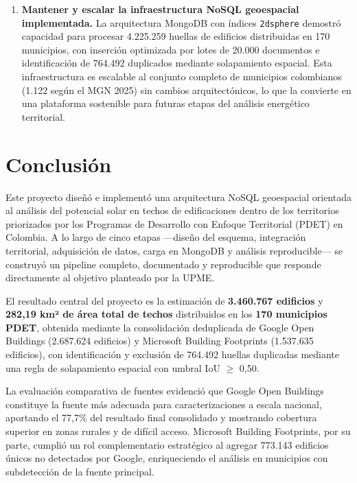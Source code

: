 \documentclass{article}
\begin{document}
\begin{enumerate}
    \item \textbf{Mantener y escalar la infraestructura NoSQL geoespacial 
    implementada.} La arquitectura MongoDB con índices \texttt{2dsphere} 
    demostró capacidad para procesar 4.225.259 huellas de edificios 
    distribuidas en 170 municipios, con inserción optimizada por lotes de 
    20.000 documentos e identificación de 764.492 duplicados mediante 
    solapamiento espacial. Esta infraestructura es escalable al conjunto 
    completo de municipios colombianos (1.122 según el MGN 2025) sin 
    cambios arquitectónicos, lo que la convierte en una plataforma 
    sostenible para futuras etapas del análisis energético territorial.

\end{enumerate}


\section{Conclusión}

Este proyecto diseñó e implementó una arquitectura NoSQL geoespacial 
orientada al análisis del potencial solar en techos de edificaciones 
dentro de los territorios priorizados por los Programas de Desarrollo 
con Enfoque Territorial (PDET) en Colombia. A lo largo de cinco etapas 
—diseño del esquema, integración territorial, adquisición de datos, 
carga en MongoDB y análisis reproducible— se construyó un pipeline 
completo, documentado y reproducible que responde directamente al 
objetivo planteado por la UPME.

El resultado central del proyecto es la estimación de \textbf{3.460.767 
edificios} y \textbf{282,19 km² de área total de techos} distribuidos 
en los \textbf{170 municipios PDET}, obtenida mediante la consolidación 
deduplicada de Google Open Buildings (2.687.624 edificios) y Microsoft 
Building Footprints (1.537.635 edificios), con identificación y exclusión 
de 764.492 huellas duplicadas mediante una regla de solapamiento espacial 
con umbral IoU $\geq$ 0,50.

La evaluación comparativa de fuentes evidenció que Google Open Buildings 
constituye la fuente más adecuada para caracterizaciones a escala nacional, 
aportando el 77,7\% del resultado final consolidado y mostrando cobertura 
superior en zonas rurales y de difícil acceso. Microsoft Building Footprints, 
por su parte, cumplió un rol complementario estratégico al agregar 773.143 
edificios únicos no detectados por Google, enriqueciendo el análisis en 
municipios con subdetección de la fuente principal.
\end{document}
